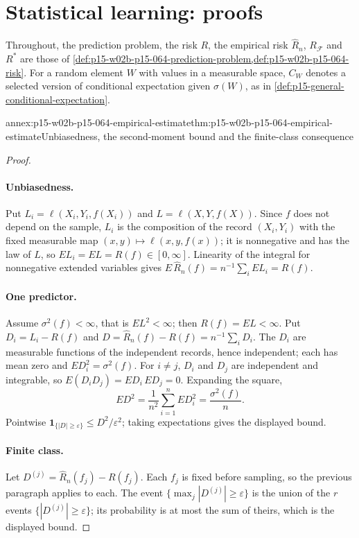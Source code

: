 \section{Statistical learning: proofs}
\label{sec:annex-p15-w02b-p15-064-prediction-risk}

Throughout, the prediction problem, the risk \(R\), the empirical risk
\(\widehat R_n\), \(R_{\mathcal F}\) and \(R^{*}\) are those of
\cref{def:p15-w02b-p15-064-prediction-problem,def:p15-w02b-p15-064-risk}.
For a random element \(W\) with values in a measurable space, \(C_W\) denotes
a selected version of conditional expectation given \(\sigma(W)\), as in
\cref{def:p15-general-conditional-expectation}.

\begin{annexitem}{annex:p15-w02b-p15-064-empirical-estimate}{thm:p15-w02b-p15-064-empirical-estimate}{Unbiasedness, the second-moment bound and the finite-class consequence}
\begin{proof}
\paragraph{Unbiasedness.}
Put \(L_i=\ell(X_i,Y_i,f(X_i))\) and \(L=\ell(X,Y,f(X))\). Since \(f\) does
not depend on the sample, \(L_i\) is the composition of the record
\((X_i,Y_i)\) with the fixed measurable map
\((x,y)\mapsto\ell(x,y,f(x))\); it is nonnegative and has the law of \(L\),
so \(EL_i=EL=R(f)\in[0,\infty]\). Linearity of the integral for nonnegative
extended variables gives
\(E\,\widehat R_n(f)=n^{-1}\sum_iEL_i=R(f)\).

\paragraph{One predictor.}
Assume \(\sigma^2(f)<\infty\), that is \(EL^2<\infty\); then
\(R(f)=EL<\infty\). Put \(D_i=L_i-R(f)\) and
\(D=\widehat R_n(f)-R(f)=n^{-1}\sum_iD_i\). The \(D_i\) are measurable
functions of the independent records, hence independent; each has mean zero
and \(ED_i^2=\sigma^2(f)\). For \(i\neq j\), \(D_i\) and \(D_j\) are
independent and integrable, so \(E(D_iD_j)=ED_i\,ED_j=0\). Expanding the
square,
\[
 ED^2=\frac1{n^2}\sum_{i=1}^nED_i^2=\frac{\sigma^2(f)}n.
\]
Pointwise \(\mathbf1_{\{|D|\geq\varepsilon\}}\leq D^2/\varepsilon^2\);
taking expectations gives the displayed bound.

\paragraph{Finite class.}
Let \(D^{(j)}=\widehat R_n(f_j)-R(f_j)\). Each \(f_j\) is fixed before
sampling, so the previous paragraph applies to each. The event
\(\{\max_j|D^{(j)}|\geq\varepsilon\}\) is the union of the \(r\) events
\(\{|D^{(j)}|\geq\varepsilon\}\); its probability is at most the sum of
theirs, which is the displayed bound.


\end{proof}
\end{annexitem}
